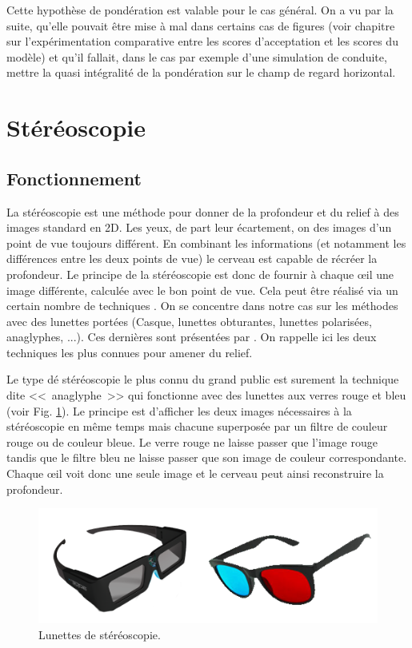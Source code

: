 	\par Cette hypothèse de pondération est valable pour le cas général. On a vu par la suite, qu'elle pouvait être mise à mal dans certains cas de figures (voir chapitre sur l'expérimentation comparative entre les scores d'acceptation et les scores du modèle) et qu'il fallait, dans le cas par exemple d'une simulation de conduite, mettre la quasi intégralité de la pondération sur le champ de regard horizontal.
	
	\section{Stéréoscopie}
	\subsection{Fonctionnement}	
	\par La stéréoscopie est une méthode pour donner de la profondeur et du relief à des images  standard en 2D. Les yeux, de part leur écartement, on des images d'un point de vue toujours différent. En combinant les informations (et notamment les différences entre les deux points de vue) le cerveau est capable de récréer la profondeur. Le principe de la stéréoscopie est donc de fournir à chaque œil une image différente, calculée avec le bon point de vue. Cela peut être réalisé via un certain nombre de techniques \citep{mehrabi_making_2013}. On se concentre dans notre cas sur les méthodes avec des lunettes portées (Casque, lunettes obturantes, lunettes polarisées, anaglyphes, ...). Ces dernières sont présentées par \cite{fauster_stereoscopic_2007}. On rappelle ici les deux techniques les plus connues pour amener du relief.
	
	\par Le type dé stéréoscopie le plus connu du grand public est surement la technique dite <<~anaglyphe~>> qui fonctionne avec des lunettes aux verres rouge et bleu (voir Fig. \ref{fig:stereo_glasses}). Le principe est d'afficher les deux images nécessaires à la stéréoscopie en même temps mais chacune superposée par un filtre de couleur rouge ou de couleur bleue. Le verre rouge ne laisse passer que l'image rouge tandis que le filtre bleu ne laisse passer que son image de couleur correspondante. Chaque œil voit donc une seule image et le cerveau peut ainsi reconstruire la profondeur.
	
	\begin{figure}
		\centering
		\includegraphics[scale=.8]{Figures/StereoActiveAnaglyphGlasses}
		\caption{Lunettes de stéréoscopie.}
		\label{fig:stereo_glasses}
	\end{figure}
	
